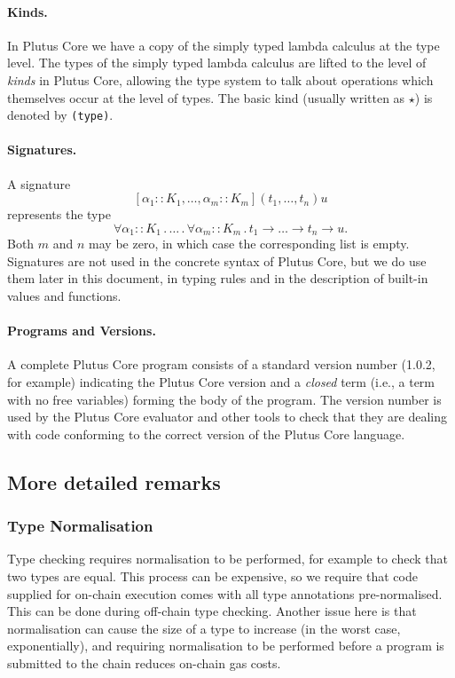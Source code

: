 \documentclass[a4paper]{article}
\begin{document}
\paragraph{Kinds.} In Plutus Core we have a copy of the 
simply typed lambda calculus at the type level. The types of the
simply typed lambda calculus are lifted to the level of
\textit{kinds} in Plutus Core, allowing the type system to talk about
operations which themselves occur at the level of types.
The basic kind (usually written as $\star$) is denoted by \texttt{(type)}.

\paragraph{Signatures.}  A signature
$$[\alpha_1::K_1, \ldots, \alpha_m::K_m](t_1, \ldots, t_n)u$$ represents
the type
$$\forall \alpha_1::K_1\,.\, \ldots \,.\, \forall \alpha_m::K_m\,.\, t_1
\rightarrow \ldots \rightarrow t_n \rightarrow u.$$
Both $m$ and $n$
may be zero, in which case the corresponding list is empty.
Signatures are not used in the concrete syntax of Plutus Core, but we
do use them later in this document, in typing rules and in the
description of built-in values and functions.

\paragraph{Programs and Versions.} A complete Plutus Core program 
consists of a standard version number (1.0.2, for example) indicating
the Plutus Core version and a \textit{closed} term (i.e., a term with no
free variables) forming the body of the program.  The version number
is used by the Plutus Core evaluator and other tools to check that
they are dealing with code conforming to the correct version of the
Plutus Core language.

\subsection{More detailed remarks}
\subsubsection{Type Normalisation}
 Type checking requires normalisation to be performed, for example to
 check that two types are equal.  This process can be expensive, so we
 require that code supplied for on-chain execution comes with all type
 annotations pre-normalised.  This can be done during off-chain type
 checking.  Another issue here is that normalisation can cause the
 size of a type to increase (in the worst case, exponentially), and
 requiring normalisation to be performed before a program is submitted
 to the chain reduces on-chain gas costs.
\end{document}
